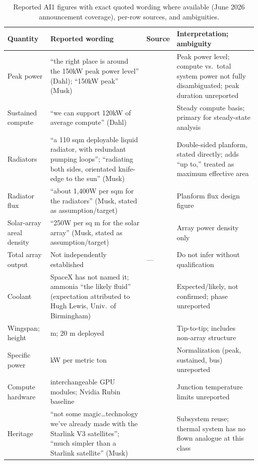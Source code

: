 \documentclass[11pt]{article}
\begin{document}
\begin{table}[ht]
\centering
\footnotesize
\begin{tabularx}{\textwidth}{>{\raggedright\arraybackslash}p{2.6cm}>{\raggedright\arraybackslash}p{4.5cm}p{1.1cm}>{\raggedright\arraybackslash}X}
\toprule
Quantity & Reported wording & Source & Interpretation; ambiguity \\
\midrule
Peak power & ``the right place is around the 150kW peak power level'' (Dahl); ``150kW peak'' (Musk) & \cite{dcd2026} & Peak power level; compute vs.\ total system power not fully disambiguated; peak duration unreported \\
Sustained compute & ``we can support 120kW of average compute'' (Dahl) & \cite{dcd2026} & Steady compute basis; primary for steady-state analysis \\
Radiators & ``a 110 sqm deployable liquid radiator, with redundant pumping loops''; ``radiating both sides, orientated knife-edge to the sun'' (Musk) & \cite{dcd2026,toms2026} & Double-sided planform, stated directly; \cite{toms2026} adds ``up to,'' treated as maximum effective area \\
Radiator flux & ``about 1,400W per sqm for the radiators'' (Musk, stated as assumption/target) & \cite{dcd2026} & Planform flux design figure \\
Solar-array areal density & ``250W per sq m for the solar array'' (Musk, stated as assumption/target) & \cite{dcd2026} & Array power density only \\
Total array output & Not independently established & --- & Do not infer without qualification \\
Coolant & SpaceX has not named it; ammonia ``the likely fluid'' (expectation attributed to Hugh Lewis, Univ.\ of Birmingham) & \cite{gagadget2026} & Expected/likely, not confirmed; phase unreported \\
Wingspan; height & 70 m; 20 m deployed & \cite{dcd2026} & Tip-to-tip; includes non-array structure \\
Specific power & 70 kW per metric ton & \cite{toms2026} & Normalization (peak, sustained, bus) unreported \\
Compute hardware & interchangeable GPU modules; Nvidia Rubin baseline & \cite{gagadget2026} & Junction temperature limits unreported \\
Heritage & ``not some magic\ldots technology we've already made with the Starlink V3 satellites''; ``much simpler than a Starlink satellite'' (Musk) & \cite{dcd2026} & Subsystem reuse; thermal system has no flown analogue at this class \\
\bottomrule
\end{tabularx}
\caption{Reported AI1 figures with exact quoted wording where available (June 2026 announcement coverage), per-row sources, and ambiguities.}
\label{tab:specs}
\end{table}
\end{document}
